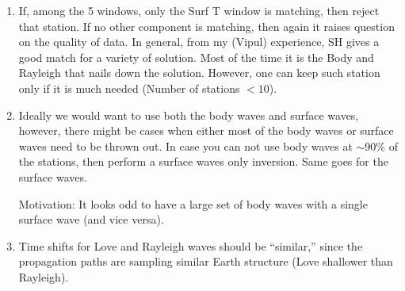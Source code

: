 \begin{enumerate}
\begin{enumerate}



\item If, among the 5 windows, only the Surf T window is matching, then reject that station. If no other component is matching, then again it raises question on the quality of data. In general, from my (Vipul) experience, SH gives a good match for a variety of solution. Most of the time it is the Body and Rayleigh that nails down the solution. However, one can keep such station only if it is much needed (Number of stations $< 10$).



\item Ideally we would want to use both the body waves and surface waves, however, there might be cases when either most of the body waves or surface waves need to be thrown out. In case you can not use body waves at $\sim$90\% of the stations, then perform a surface waves only inversion. Same goes for the surface waves.

Motivation: It looks odd to have a large set of body waves with a single surface wave (and vice versa).


\item Time shifts for Love and Rayleigh waves should be ``similar,'' since the propagation paths are sampling similar Earth structure (Love shallower than Rayleigh). 


\end{enumerate}
\end{enumerate}
